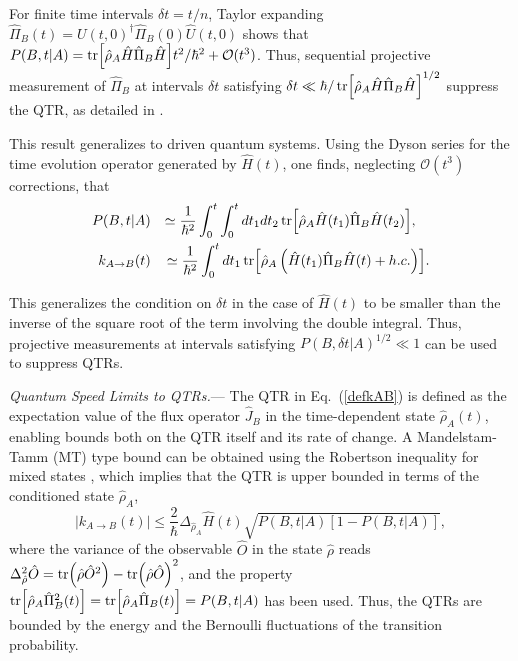 \documentclass[prl,aps,amssymb,twocolumn,superscriptaddress, notitlepage, longbibliography]{revtex4-2}
\begin{document}
For finite time intervals $\delta t=t/n$, Taylor expanding  $\hat{\Pi}_B(t)=U(t,0)^\dag \hat{\Pi}_B(0)\hat{U}(t,0)$ shows that $P(B,t\vert A)=\tr[\hat{\rho}_A\hat{H}\hat{\Pi}_B \hat{H}]t^2/\hbar^2+\mathcal{O}(t^3)$.
Thus, sequential projective measurement of $\hat{\Pi}_B$ at intervals $\delta t$ satisfying
$\delta t\ll \hbar/\tr[\hat{\rho}_A\hat{H}\hat{\Pi}_B \hat{H}]^{1/2}$ suppress the QTR, as detailed in \cite{SM}.

This result generalizes to driven quantum systems.
Using the Dyson series for the time evolution operator generated by $\hat{H}(t)$,
one finds, neglecting $\mathcal{O}(t^3)$ corrections,  that
\begin{eqnarray}\label{eq:Zeno_PAB}
  P(B,t\vert A)&&\simeq\frac{1}{\hbar^2}\int_0^t\int_0^t dt_1dt_2\tr[\hat{\rho}_A\hat{H}(t_1)\hat{\Pi}_B \hat{H}(t_2)],\quad\\
  k_{A\rightarrow B}(t)&&\simeq\frac{1}{\hbar^2}\int_0^tdt_1\tr[\hat{\rho}_A\left(\hat{H}(t_1)\hat{\Pi}_B \hat{H}(t)+h.c.\right)].\nonumber
\end{eqnarray}

This generalizes the condition on $\delta t$ in the case of $\hat{H}(t)$ to be smaller than the inverse of the square root of the term involving the double integral. Thus, projective measurements at intervals satisfying $P(B,\delta  t|A)^{1/2}\ll 1$ can be used to suppress QTRs.



{\it Quantum Speed Limits to QTRs.}---
The QTR in Eq.~(\ref{defkAB}) is defined as the expectation value of the flux operator $\hat{J}_B$ in the time-dependent state $\hat{\rho}_A(t)$, enabling bounds both on the QTR itself and its rate of change. A Mandelstam-Tamm (MT) type bound can be obtained using the Robertson inequality for mixed states \cite{Gong22}, which implies that the QTR is upper bounded in terms of the conditioned state $\hat{\rho}_A$,
\begin{equation}
\label{absk}
    |k_{A\rightarrow B}(t)|
    \leq \frac{2}{\hbar}\Delta_{\hat{\rho}_A} \hat H(t)
    \sqrt{
    P(B,t\vert A)
    \left[
    1 -
    P(B,t\vert A)
    \right]
    },
\end{equation}
where the variance of the observable $\hat{O}$ in the state $\hat{\rho}$ reads $\Delta_{\hat{\rho}}^2 \hat{O}=\tr(\hat{\rho} \hat{O}^2)-\tr(\hat{\rho} \hat{O})^2$, and the property $\tr[\hat\rho_A\hat\Pi^2_B(t)]=\tr[\hat\rho_A\hat\Pi_B(t)]=P(B,t\vert A)$ has been used. Thus, the QTRs are bounded by the energy and the Bernoulli fluctuations of the transition probability.
\end{document}
